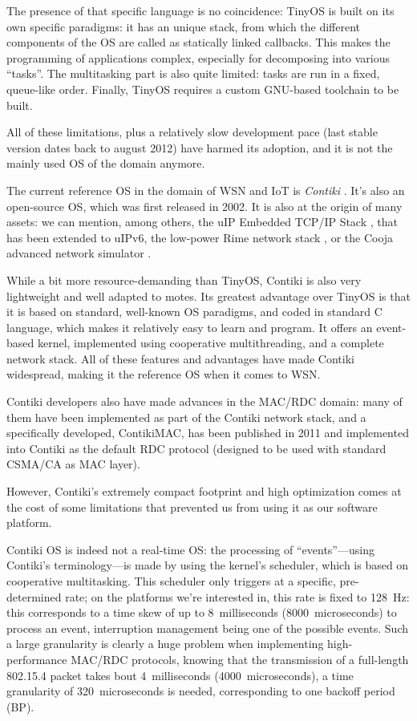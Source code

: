 \documentclass[a4paper,twoside]{article}
\begin{document}
The presence of that specific language is no coincidence: TinyOS is built
on its own specific paradigms: it has an unique stack, from which the
different components of the OS are called as statically linked callbacks.
This makes the programming of applications complex, especially for
decomposing into various ``tasks''. The multitasking part is also
quite limited: tasks are run in a fixed, queue-like order. Finally,
TinyOS requires a custom GNU-based toolchain to be built.

All of these limitations, plus a relatively slow development pace (last
stable version dates back to august 2012) have harmed its adoption,
and it is not the mainly used OS of the domain anymore.


The current reference OS in the domain of WSN and IoT is \emph{Contiki}
\cite{ContikiOS}. It's also an open-source OS, which was first released
in 2002. It is also at the origin of many assets: we can mention, among
others, the uIP Embedded TCP/IP Stack \cite{uip}, that has been extended
to uIPv6, the low-power Rime network stack \cite{Rime}, or the Cooja advanced
network simulator \cite{Cooja}.

While a bit more resource-demanding than TinyOS, Contiki is also very
lightweight and well adapted to motes. Its greatest advantage over TinyOS
is that it is based on standard, well-known OS paradigms, and coded
in standard C language, which makes it relatively easy to learn and program.
It offers an event-based kernel, implemented using cooperative multithreading,
and a complete network stack. All of these features and advantages have made
Contiki widespread, making it the reference OS when it comes to WSN.

Contiki developers also have made advances in the MAC/RDC domain: many
of them have been implemented as part of the Contiki network stack, and
a specifically developed, ContikiMAC, has been published in 2011
\cite{ContikiMAC} and implemented into Contiki as the default
RDC protocol (designed to be used with standard CSMA/CA as MAC layer).

However, Contiki's extremely compact footprint and high optimization comes
at the cost of some limitations that prevented us from using it as our
software platform.

Contiki OS is indeed not a real-time OS: the processing of ``events''---using
Contiki's terminology---is made by using the kernel's scheduler, which is
based on cooperative multitasking. This scheduler only triggers at a specific,
pre-determined rate; on the platforms we're interested in, this rate is
fixed to 128~Hz: this corresponds to a time skew of up to 8~milliseconds
(8000~microseconds) to process an event, interruption management being
one of the possible events. Such a large granularity is clearly
a huge problem when implementing high-performance MAC/RDC protocols,
knowing that the transmission of a full-length 802.15.4 packet takes
bout 4~milliseconds (4000~microseconds), a time granularity of
320~microseconds is needed, corresponding to one backoff period (BP).
\end{document}
